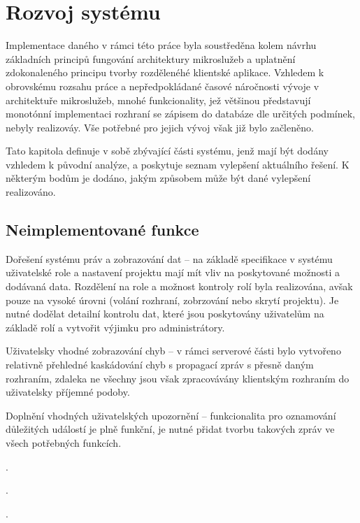 \chapter{Rozvoj systému}\label{ch:improvements}


Implementace daného  v rámci této práce byla soustředěna kolem návrhu základních principů fungování architektury mikroslužeb a uplatnění zdokonaleného principu tvorby rozdělenéhé klientské aplikace.
Vzhledem k obrovskému rozsahu práce a nepředpokládané časové náročnosti vývoje v architektuře mikroslužeb, mnohé funkcionality, jež většinou představují monotónní implementaci  rozhraní se zápisem do databáze dle určitých podmínek, nebyly realizováy.
Vše potřebné pro jejich vývoj však již bylo začleněno.

Tato kapitola definuje v sobě zbývající části systému, jenž mají být dodány vzhledem k původní analýze, a poskytuje seznam vylepšení aktuálního řešení.
K některým bodům je dodáno, jakým způsobem může být dané vylepšení realizováno.



\section{Neimplementované funkce}\label{sec:unimplemented}

\begin{dl}
   \item[Dořešení systému práv a zobrazování dat] – na základě specifikace v systému uživatelské role a nastavení projektu mají mít vliv na poskytované možnosti a dodávaná data.
   Rozdělení na role a možnost kontroly rolí byla realizována, avšak pouze na vysoké úrovni (volání rozhraní, zobrzování nebo skrytí projektu).
   Je nutné dodělat detailní kontrolu dat, které jsou poskytovány uživatelům na základě rolí a vytvořit výjimku pro administrátory.
   \item[Uživatelsky vhodné zobrazování chyb] – v rámci serverové části bylo vytvořeno relativně přehledné kaskádování chyb s propagací zpráv s přesně daným rozhraním, zdaleka ne všechny jsou však zpracovávány klientským rozhraním do uživatelsky příjemné podoby.
   \item[Doplnění vhodných uživatelských upozornění] – funkcionalita pro oznamování důležitých událostí je plně funkční, je nutné přidat tvorbu takových zpráv ve všech potřebných funkcích.
   \item[] .
   \item[] .
   \item[] .
\end{dl}

